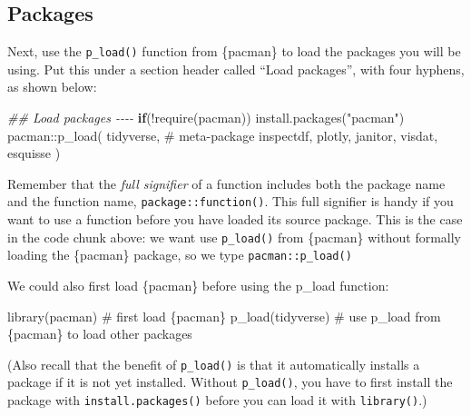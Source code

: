 \documentclass[
  letterpaper,
  DIV=11,
  numbers=noendperiod]{scrreprt}
\newenvironment{Shaded}{\begin{snugshade}}{\end{snugshade}}
\newcommand{\CommentTok}[1]{\textcolor[rgb]{0.37,0.37,0.37}{#1}}
\newcommand{\ControlFlowTok}[1]{\textcolor[rgb]{0.00,0.23,0.31}{\textbf{#1}}}
\newcommand{\DocumentationTok}[1]{\textcolor[rgb]{0.37,0.37,0.37}{\textit{#1}}}
\newcommand{\FunctionTok}[1]{\textcolor[rgb]{0.28,0.35,0.67}{#1}}
\newcommand{\NormalTok}[1]{\textcolor[rgb]{0.00,0.23,0.31}{#1}}
\newcommand{\SpecialCharTok}[1]{\textcolor[rgb]{0.37,0.37,0.37}{#1}}
\newcommand{\StringTok}[1]{\textcolor[rgb]{0.13,0.47,0.30}{#1}}
\begin{document}
\subsection{Packages}\label{packages-2}

Next, use the \texttt{p\_load()} function from \{pacman\} to load the
packages you will be using. Put this under a section header called
``Load packages'', with four hyphens, as shown below:

\begin{Shaded}
\begin{Highlighting}[]
\DocumentationTok{\#\# Load packages {-}{-}{-}{-}}
\ControlFlowTok{if}\NormalTok{(}\SpecialCharTok{!}\FunctionTok{require}\NormalTok{(pacman)) }\FunctionTok{install.packages}\NormalTok{(}\StringTok{"pacman"}\NormalTok{)}
\NormalTok{pacman}\SpecialCharTok{::}\FunctionTok{p\_load}\NormalTok{(}
\NormalTok{  tidyverse, }\CommentTok{\# meta{-}package}
\NormalTok{  inspectdf,}
\NormalTok{  plotly,}
\NormalTok{  janitor,}
\NormalTok{  visdat,}
\NormalTok{  esquisse}
\NormalTok{)}
\end{Highlighting}
\end{Shaded}

\begin{tcolorbox}[enhanced jigsaw, title=\textcolor{quarto-callout-note-color}{\faInfo}\hspace{0.5em}{Reminder}, colbacktitle=quarto-callout-note-color!10!white, leftrule=.75mm, arc=.35mm, opacityback=0, bottomrule=.15mm, rightrule=.15mm, toptitle=1mm, breakable, toprule=.15mm, colback=white, coltitle=black, colframe=quarto-callout-note-color-frame, bottomtitle=1mm, titlerule=0mm, left=2mm, opacitybacktitle=0.6]

Remember that the \emph{full signifier} of a function includes both the
package name and the function name, \texttt{package::function()}. This
full signifier is handy if you want to use a function before you have
loaded its source package. This is the case in the code chunk above: we
want use \texttt{p\_load()} from \{pacman\} without formally loading the
\{pacman\} package, so we type \texttt{pacman::p\_load()}

We could also first load \{pacman\} before using the p\_load function:

\begin{Shaded}
\begin{Highlighting}[]
\FunctionTok{library}\NormalTok{(pacman) }\CommentTok{\# first load \{pacman\}}
\FunctionTok{p\_load}\NormalTok{(tidyverse) }\CommentTok{\# use \textasciigrave{}p\_load\textasciigrave{} from \{pacman\} to load other packages}
\end{Highlighting}
\end{Shaded}

(Also recall that the benefit of \texttt{p\_load()} is that it
automatically installs a package if it is not yet installed. Without
\texttt{p\_load()}, you have to first install the package with
\texttt{install.packages()} before you can load it with
\texttt{library()}.)

\end{tcolorbox}
\end{document}
